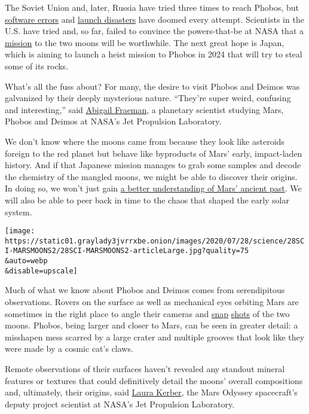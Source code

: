 The Soviet Union and, later, Russia have tried three times to reach
Phobos, but
\href{https://www.planetary.org/explore/space-topics/space-missions/missions-to-mars.html\#phobos2}{software
errors} and
\href{https://solarsystem.nasa.gov/missions/phobos-grunt/in-depth/}{launch
disasters} have doomed every attempt. Scientists in the U.S. have tried
and, so far, failed to convince the powers-that-be at NASA that a
\href{https://www.lpi.usra.edu/meetings/LPSC99/pdf/1155.pdf}{mission} to
the two moons will be worthwhile. The next great hope is Japan, which is
aiming to launch a heist mission to Phobos in 2024 that will try to
steal some of its rocks.

What's all the fuss about? For many, the desire to visit Phobos and
Deimos was galvanized by their deeply mysterious nature. ``They're super
weird, confusing and interesting,'' said
\href{https://science.jpl.nasa.gov/people/Fraeman/}{Abigail Fraeman}, a
planetary scientist studying Mars, Phobos and Deimos at NASA's Jet
Propulsion Laboratory.

We don't know where the moons came from because they look like asteroids
foreign to the red planet but behave like byproducts of Mars' early,
impact-laden history. And if that Japanese mission manages to grab some
samples and decode the chemistry of the mangled moons, we might be able
to discover their origins. In doing so, we won't just gain
\href{https://www.nytimes3xbfgragh.onion/2020/07/24/science/mars-life-water.html}{a
better understanding of Mars' ancient past}. We will also be able to
peer back in time to the chaos that shaped the early solar system.

\texttt{[image: https://static01.graylady3jvrrxbe.onion/images/2020/07/28/science/28SCI-MARSMOONS2/28SCI-MARSMOONS2-articleLarge.jpg?quality=75\\\&auto=webp\\\&disable=upscale]}

Much of what we know about Phobos and Deimos comes from serendipitous
observations. Rovers on the surface as well as mechanical eyes orbiting
Mars are sometimes in the right place to angle their cameras and
\href{https://www.jpl.nasa.gov/news/news.php?feature=7674}{snap}
\href{https://mars.nasa.gov/resources/22392/curiosity-observes-phobos-eclipse-sol-2359/}{shots}
of the two moons. Phobos, being larger and closer to Mars, can be seen
in greater detail: a misshapen mess scarred by a large crater and
multiple grooves that look like they were made by a cosmic cat's claws.

Remote observations of their surfaces haven't revealed any standout
mineral features or textures that could definitively detail the moons'
overall compositions and, ultimately, their origins, said
\href{https://science.jpl.nasa.gov/people/Kerber/}{Laura Kerber}, the
Mars Odyssey spacecraft's deputy project scientist at NASA's Jet
Propulsion Laboratory.

